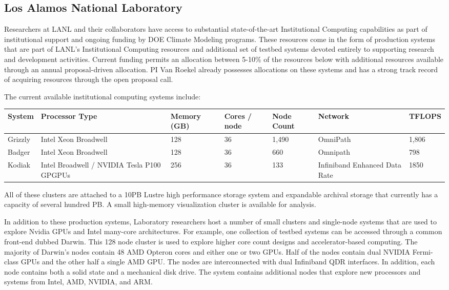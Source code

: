 
\subsection*{Los Alamos National Laboratory}

Researchers at LANL and their collaborators have access to substantial
state-of-the-art Institutional Computing capabilities as part of institutional
support and ongoing funding by DOE Climate Modeling programs. 
These resources
come in the form of production systems that are part of LANL's
Institutional Computing resources and additional set of testbed
systems devoted entirely to supporting research and development
activities.
Current funding permits an allocation between 5-10\% of the resources below
with additional resources available through an annual proposal-driven
allocation. PI Van Roekel already possesses allocations on these systems and has a strong track record of acquiring resources through the open proposal call.


The current available institutional computing systems include: 
\begin{center}
  \begin{tabular}{|p{0.75in}|p{0.7in}|p{0.6in}|p{0.5in}|p{0.45in}|p{0.75in}|l|}
  \hline 
  \textbf{System} & \textbf{Processor Type} & \textbf{Memory (GB)} & \textbf{Cores / node} & \textbf{Node Count} & \textbf{Network} & \textbf{TFLOPS}\\
  \hline
  \hline 
  Grizzly & Intel Xeon Broadwell & 128 & 36  & 1,490 & OmniPath & 1,806  \\
  \hline
  Badger    & Intel Xeon Broadwell & 128 & 36 & 660 & Omnipath &  798 \\
  \hline
  Kodiak     & Intel Broadwell / NVIDIA Tesla P100 GPGPUs & 256 & 36 & 133 & Infiniband Enhanced Data Rate   & 1850 \\
  \hline
  \end{tabular}
\end{center}

All of these clusters are attached to a 10PB Lustre high performance storage
system and expandable archival storage that currently has a capacity of several
hundred PB. A small high-memory visualization cluster is available for
analysis.

In addition to these production systems, Laboratory researchers host a number
of small clusters and single-node systems that are used to explore Nvidia GPUs
and Intel many-core architectures. 
For example, one collection of testbed systems can be accessed through
a common front-end dubbed Darwin.  This 128 node cluster is used
to explore higher core count designs and accelerator-based computing.
The majority of Darwin's nodes contain 48 AMD Opteron cores and either
one or two GPUs.  Half of the nodes contain dual NVIDIA Fermi-class
GPUs and the other half a single AMD GPU. The nodes are interconnected
with dual Infiniband QDR interfaces.  In addition, each node contains
both a solid state and a mechanical disk drive.  The system contains
additional nodes that explore new processors and systems from Intel,
AMD, NVIDIA, and ARM. 




